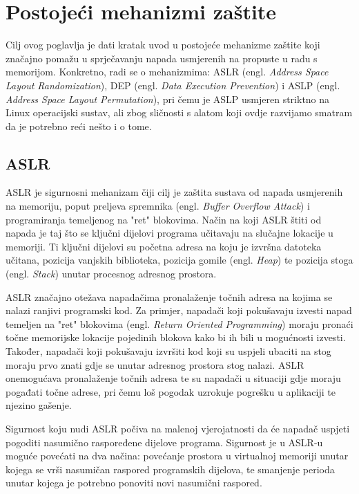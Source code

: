 \documentclass[times, utf8, diplomski, numeric]{fer}
\begin{document}
\chapter{Postojeći mehanizmi zaštite}

Cilj ovog poglavlja je dati kratak uvod u postojeće mehanizme
zaštite koji značajno pomažu u sprječavanju napada usmjerenih na
propuste u radu s memorijom. Konkretno, radi se o mehanizmima: ASLR (engl. 
\emph{Address Space Layout Randomization}), DEP (engl. \emph{Data
Execution Prevention}) i ASLP (engl. \emph{Address Space Layout
Permutation}), pri čemu je ASLP usmjeren striktno na Linux
operacijski sustav, ali zbog sličnosti s alatom koji ovdje
razvijamo smatram da je potrebno reći nešto i o tome. 

\section{ASLR}
\label{sct:aslr}

ASLR je sigurnosni mehanizam čiji cilj je zaštita sustava od
napada usmjerenih na memoriju, poput preljeva spremnika (engl. 
\emph{Buffer Overflow Attack}) i programiranja temeljenog na
"ret" blokovima. Način na koji ASLR štiti od napada je taj što se
ključni dijelovi programa učitavaju na slučajne lokacije u
memoriji. Ti ključni dijelovi su početna adresa na koju je
izvršna datoteka učitana, pozicija vanjskih biblioteka, pozicija
gomile (engl. \emph{Heap}) te pozicija stoga (engl. \emph{Stack}) 
unutar procesnog adresnog prostora.

ASLR značajno otežava napadačima pronalaženje točnih adresa na
kojima se nalazi ranjivi programski kod. Za primjer, napadači
koji pokušavaju izvesti napad temeljen na "ret" blokovima 
(engl. \emph{Return Oriented Programming}) \citep{rop_official} 
moraju pronaći točne memorijske lokacije pojedinih blokova kako
bi ih bili u mogućnosti izvesti. Također, napadači koji
pokušavaju izvršiti kod koji su uspjeli ubaciti na stog moraju
prvo znati gdje se unutar adresnog prostora stog nalazi. ASLR
onemogućava pronalaženje točnih adresa te su napadači u situaciji
gdje moraju pogađati točne adrese, pri čemu loš pogodak uzrokuje
pogrešku u aplikaciji te njezino gašenje.

Sigurnost koju nudi ASLR počiva na malenoj vjerojatnosti da će
napadač uspjeti pogoditi nasumično raspoređene dijelove programa.
Sigurnost je u ASLR-u moguće povećati na dva načina: povećanje
prostora u virtualnoj memoriji unutar kojega se vrši nasumičan
raspored programskih dijelova, te smanjenje perioda unutar kojega
je potrebno ponoviti novi nasumični raspored. 
\end{document}

